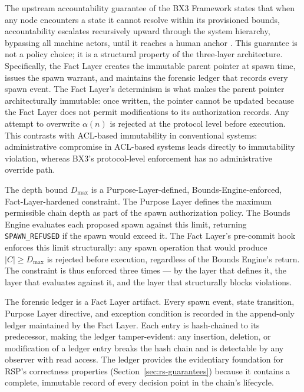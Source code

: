 \documentclass[12pt]{article}
\begin{document}
The upstream accountability guarantee of the BX3 Framework states that when any node encounters a state it cannot resolve within its provisioned bounds, accountability escalates recursively upward through the system hierarchy, bypassing all machine actors, until it reaches a human anchor \cite{bx3-framework,bx3framework2026}. This guarantee is not a policy choice; it is a structural property of the three-layer architecture. Specifically, the Fact Layer creates the immutable parent pointer at spawn time, issues the spawn warrant, and maintains the forensic ledger that records every spawn event. The Fact Layer's determinism is what makes the parent pointer architecturally immutable: once written, the pointer cannot be updated because the Fact Layer does not permit modifications to its authorization records. Any attempt to overwrite $\alpha(n)$ is rejected at the protocol level before execution. This contrasts with ACL-based immutability in conventional systems: administrative compromise in ACL-based systems leads directly to immutability violation, whereas BX3's protocol-level enforcement has no administrative override path.

The depth bound $D_{\max}$ is a Purpose-Layer-defined, Bounds-Engine-enforced, Fact-Layer-hardened constraint. The Purpose Layer defines the maximum permissible chain depth as part of the spawn authorization policy. The Bounds Engine evaluates each proposed spawn against this limit, returning \texttt{SPAWN\_REFUSED} if the spawn would exceed it. The Fact Layer's pre-commit hook enforces this limit structurally: any spawn operation that would produce $|C| \geq D_{\max}$ is rejected before execution, regardless of the Bounds Engine's return. The constraint is thus enforced three times --- by the layer that defines it, the layer that evaluates against it, and the layer that structurally blocks violations.

The forensic ledger is a Fact Layer artifact. Every spawn event, state transition, Purpose Layer directive, and exception condition is recorded in the append-only ledger maintained by the Fact Layer. Each entry is hash-chained to its predecessor, making the ledger tamper-evident: any insertion, deletion, or modification of a ledger entry breaks the hash chain and is detectable by any observer with read access. The ledger provides the evidentiary foundation for RSP's correctness properties (Section~\ref{sec:rs-guarantees}) because it contains a complete, immutable record of every decision point in the chain's lifecycle.
\end{document}

